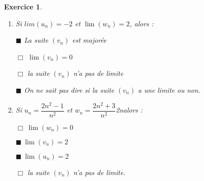 \documentclass[12pt,a4paper,french]{article}
\theoremstyle{break}
\newtheorem{exercice}{Exercice}
\theoremstyle{nonumberplain}
\theoremstyle{nonumberbreak}
\begin{document}
\begin{exercice}
\begin{enumerate}
    \item Si $lim \left(u_{n}\right) = - 2$ et $\lim \left(w_{n}\right)
      = 2$, alors :

      $\blacksquare$ La suite $\left(v_{n}\right)$ est majorée

      $\Box$ $\lim \left(v_{n}\right) = 0$

      $\Box$ la suite $\left(v_{n}\right)$ n'a pas de limite

      $\blacksquare$ On ne sait pas dire si la suite $\left(v_{n}\right)$ a une
      limite ou non.

    \item Si $u_{n} =\dfrac{2n^2-1}{n^2}$ et  $w_{n} =
      \dfrac{2n^2+3}{n^2}$2nalors :

      $\Box~ \lim \left(w_{n}\right) = 0$

      $\blacksquare~ \lim \left(v_{n}\right) = 2$

      $\blacksquare~  \lim \left(u_{n}\right) = 2$

      $\Box$ la suite $\left(v_{n}\right)$ n'a pas de limite.

  \end{enumerate}
\end{exercice}

\pagebreak
\end{document}
